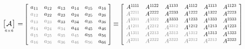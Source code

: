 \begin{gather}\label{stiffnessasmatrix}
\displaystyle
\asmatrixwithdimensions{\mathcal{A}}{6}{6}
\hspace{.1ex} = \hspace{-0.2ex}
\scalebox{.82}{$ \left[ \hspace{.4em}
   \begin{matrix}
      a_{11} & a_{12} & a_{13} & a_{14} & a_{15} & a_{16} \\
      \mathgray{a_{12}} & a_{22} & a_{23} & a_{24} & a_{25} & a_{26} \\
      \mathgray{a_{13}} & \mathgray{a_{23}} & a_{33} & a_{34} & a_{35} & a_{36} \\
      \mathgray{a_{14}} & \mathgray{a_{24}} & \mathgray{a_{34}} & a_{44} & a_{45} & a_{46} \\
      \mathgray{a_{15}} & \mathgray{a_{25}} & \mathgray{a_{35}} & \mathgray{a_{45}} & a_{55} & a_{56} \\
      \mathgray{a_{16}} & \mathgray{a_{26}} & \mathgray{a_{36}} & \mathgray{a_{46}} & \mathgray{a_{56}} & a_{66}
   \end{matrix}
\hspace{.32em} \right] $}
%
\hspace{-0.2ex} \equiv \hspace{-0.2ex}
%
\scalebox{.82}{$ \left[ \hspace{.4em}
   \begin{matrix}
     A^{\oneone\hspace{-0.1ex}\oneone} &
     A^{\oneone 22} &
     A^{\oneone 33} &
     A^{\oneone\hspace{-0.1ex}12} &
     A^{\oneone\hspace{-0.1ex}13} &
     A^{\oneone 23}
     \\
     \mathgray{A^{22\oneone}} &
     A^{2222} &
     A^{2233} &
     A^{1222} &
     A^{1322} &
     A^{2223}
     \\
     \mathgray{A^{33\oneone}} &
     \mathgray{A^{3322}} &
     A^{3333} &
     A^{1233} &
     A^{1333} &
     A^{2333}
     \\
     \mathgray{A^{12\oneone}} &
     \mathgray{A^{2212}} &
     \mathgray{A^{3312}} &
     A^{1212} &
     A^{1213} &
     A^{1223}
     \\
     \mathgray{A^{13\oneone}} &
     \mathgray{A^{2213}} &
     \mathgray{A^{3313}} &
     \mathgray{A^{1312}} &
     A^{1313} &
     A^{1323}
     \\
     \mathgray{A^{23\oneone}} &
     \mathgray{A^{2322}} &
     \mathgray{A^{3323}} &
     \mathgray{A^{2312}} &
     \mathgray{A^{2313}} &
     A^{2323}
   \end{matrix}
\hspace{.4em} \right] $}
\end{gather}

